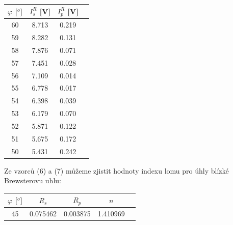 \documentclass[a4paper,11pt]{article}
\begin{document}
    \hspace{10pt}  
    \begin{minipage}[t]{0.5\textwidth} 
                \par \centering
                \begin{tabular}{|c|c|c|c|}
                    \hline
                    $\varphi$ [$^o$] &  $I_s^R$ [V]  & $I_p^R$ [V] \\
                    \hline
                    60 & 8.713 & 0.219 \\
                    \hline
                    59 & 8.282 & 0.131 \\
                    \hline
                    58 & 7.876 & 0.071 \\
                    \hline
                    57 & 7.451 & 0.028 \\
                    \hline
                    56 & 7.109 & 0.014 \\
                    \hline
                    55 & 6.778 & 0.017 \\
                    \hline
                    54 & 6.398 & 0.039 \\
                    \hline
                    53 & 6.179 & 0.070 \\
                    \hline
                    52 & 5.871 & 0.122 \\
                    \hline
                    51 & 5.675 & 0.172 \\
                    \hline
                    50 & 5.431 & 0.242 \\
                    \hline
                \end{tabular}
                \captionsetup{justification=centering, font=footnotesize}
                \vspace{10pt}
                \raggedright
                \vspace{10pt}
                \par Ze vzorců (6) a (7) můžeme zjistit hodnoty indexu lomu pro úhly blízké Brewsterovu uhlu:  
                \vspace{10pt}
                \par \centering
                \begin{tabular}{|c|c|c|c|c}
                    \hline
                    $\varphi$ [$^o$] & $R_s$ & $R_p$ & $n$\\
                    \hline
                    45 & 0.075462 & 0.003875 & 1.410969 \\

\end{tabular}
\end{minipage}
\end{document}
